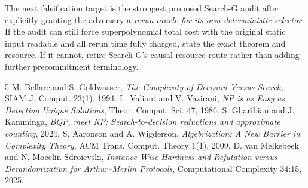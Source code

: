 \documentclass[11pt]{article}
\begin{document}
The next falsification target is the strongest proposed Search-G audit after explicitly granting the adversary a \emph{rerun oracle for its own deterministic selector}. If the audit can still force superpolynomial total cost with the original static input readable and all rerun time fully charged, state the exact theorem and resource. If it cannot, retire Search-G's causal-resource route rather than adding further precommitment terminology.

\begin{thebibliography}{5}
 M. Bellare and S. Goldwasser, \emph{The Complexity of Decision Versus Search}, SIAM J. Comput. 23(1), 1994.
 L. Valiant and V. Vazirani, \emph{NP is as Easy as Detecting Unique Solutions}, Theor. Comput. Sci. 47, 1986.
 S. Gharibian and J. Kamminga, \emph{BQP, meet NP: Search-to-decision reductions and approximate counting}, 2024.
 S. Aaronson and A. Wigderson, \emph{Algebrization: A New Barrier in Complexity Theory}, ACM Trans. Comput. Theory 1(1), 2009.
 D. van Melkebeek and N. Mocelin Sdroievski, \emph{Instance-Wise Hardness and Refutation versus Derandomization for Arthur--Merlin Protocols}, Computational Complexity 34:15, 2025.
\end{thebibliography}
\end{document}
